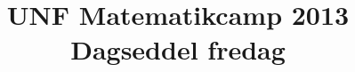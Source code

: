 \documentclass[article,10pt,oneside]{article}
\begin{document}
\title{UNF Matematikcamp 2013 \\ Dagseddel fredag}

\begin{minipage}[t]{410mm}
\begin{minipage}[t]{200mm}

\end{minipage}%
\hspace{10mm}\begin{minipage}[t]{200mm}

\end{minipage}
\end{minipage}

\newpage

\begin{minipage}[t]{410mm}

\end{minipage}
\end{document}
